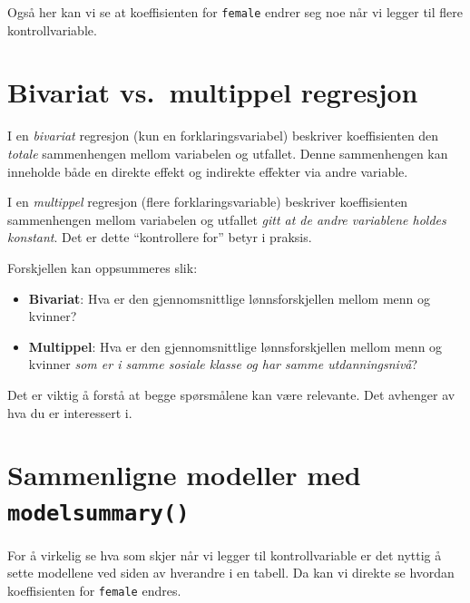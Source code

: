 \documentclass[
  norsk,
  letterpaper,
  DIV=11,
  numbers=noendperiod]{scrreprt}
\providecommand{\tightlist}{%
  \setlength{\itemsep}{0pt}\setlength{\parskip}{0pt}}
\theoremstyle{definition}
\theoremstyle{remark}
\begin{document}
Også her kan vi se at koeffisienten for \texttt{female} endrer seg noe
når vi legger til flere kontrollvariable.

\section{Bivariat vs.~multippel
regresjon}\label{bivariat-vs.-multippel-regresjon}

I en \emph{bivariat} regresjon (kun en forklaringsvariabel) beskriver
koeffisienten den \emph{totale} sammenhengen mellom variabelen og
utfallet. Denne sammenhengen kan inneholde både en direkte effekt og
indirekte effekter via andre variable.

I en \emph{multippel} regresjon (flere forklaringsvariable) beskriver
koeffisienten sammenhengen mellom variabelen og utfallet \emph{gitt at
de andre variablene holdes konstant}. Det er dette ``kontrollere for''
betyr i praksis.

Forskjellen kan oppsummeres slik:

\begin{itemize}
\tightlist
\item
  \textbf{Bivariat}: Hva er den gjennomsnittlige lønnsforskjellen mellom
  menn og kvinner?
\item
  \textbf{Multippel}: Hva er den gjennomsnittlige lønnsforskjellen
  mellom menn og kvinner \emph{som er i samme sosiale klasse og har
  samme utdanningsnivå}?
\end{itemize}

Det er viktig å forstå at begge spørsmålene kan være relevante. Det
avhenger av hva du er interessert i.

\section{\texorpdfstring{Sammenligne modeller med
\texttt{modelsummary()}}{Sammenligne modeller med modelsummary()}}\label{sammenligne-modeller-med-modelsummary}

For å virkelig se hva som skjer når vi legger til kontrollvariable er
det nyttig å sette modellene ved siden av hverandre i en tabell. Da kan
vi direkte se hvordan koeffisienten for \texttt{female} endres.
\end{document}
